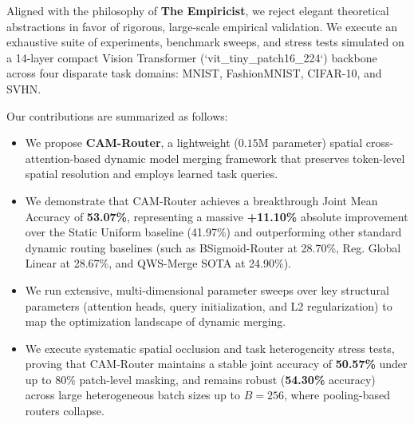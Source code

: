Aligned with the philosophy of \textbf{The Empiricist}, we reject elegant theoretical abstractions in favor of rigorous, large-scale empirical validation. We execute an exhaustive suite of experiments, benchmark sweeps, and stress tests simulated on a 14-layer compact Vision Transformer (`vit\_tiny\_patch16\_224`) backbone across four disparate task domains: MNIST, FashionMNIST, CIFAR-10, and SVHN. 

Our contributions are summarized as follows:
\begin{itemize}
    \item We propose \textbf{CAM-Router}, a lightweight ($0.15\text{M}$ parameter) spatial cross-attention-based dynamic model merging framework that preserves token-level spatial resolution and employs learned task queries.
    \item We demonstrate that CAM-Router achieves a breakthrough Joint Mean Accuracy of \textbf{53.07\%}, representing a massive \textbf{+11.10\%} absolute improvement over the Static Uniform baseline (41.97\%) and outperforming other standard dynamic routing baselines (such as BSigmoid-Router at 28.70\%, Reg. Global Linear at 28.67\%, and QWS-Merge SOTA at 24.90\%).
    \item We run extensive, multi-dimensional parameter sweeps over key structural parameters (attention heads, query initialization, and L2 regularization) to map the optimization landscape of dynamic merging.
    \item We execute systematic spatial occlusion and task heterogeneity stress tests, proving that CAM-Router maintains a stable joint accuracy of \textbf{50.57\%} under up to 80\% patch-level masking, and remains robust (\textbf{54.30\%} accuracy) across large heterogeneous batch sizes up to $B=256$, where pooling-based routers collapse.
\end{itemize}